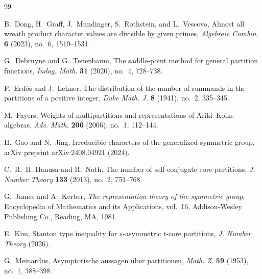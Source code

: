 \documentclass[11pt]{amsart}
\theoremstyle{plain}
\numberwithin{equation}{section}
\begin{document}
\begin{thebibliography}{99}
		
		B.~Dong, H.~Graff, J.~Mundinger, S.~Rothstein, and L.~Vescovo,
		\newblock Almost all wreath product character values are divisible by given primes,
		\newblock \emph{Algebraic Combin.} \textbf{6} (2023), no.~6, 1519--1531.
		
		G.~Debruyne and G.~Tenenbaum,
		\newblock The saddle-point method for general partition functions,
		\newblock \emph{Indag. Math.} \textbf{31} (2020), no.~4, 728--738.
		
		
		P.~Erd\H{o}s and J.~Lehner,
		\newblock The distribution of the number of summands in the partitions of a
		positive integer,
		\newblock \emph{Duke Math. J.} \textbf{8} (1941), no.~2, 335--345.
		
		M.~Fayers,
		\newblock Weights of multipartitions and representations of Ariki--Koike algebras,
		\newblock \emph{Adv. Math.} \textbf{206} (2006), no.~1, 112--144.
		
		
		
		H.~Gao and N.~Jing,
		\newblock Irreducible characters of the generalized symmetric group,
		\newblock arXiv preprint arXiv:2408.04921 (2024).
		
		C.~R.~H. Hanusa and R.~Nath,
		\newblock The number of self-conjugate core partitions,
		\newblock \emph{J. Number Theory} \textbf{133} (2013), no.~2, 751--768.
		
		G.~James and A.~Kerber,
		\newblock \emph{The representation theory of the symmetric group},
		\newblock Encyclopedia of Mathematics and its Applications, vol.~16,
		Addison-Wesley Publishing Co., Reading, MA, 1981.
		
		E.~Kim,
		\newblock Stanton type inequality for $s$-asymmetric $t$-core partitions,
		\newblock \emph{J. Number Theory} (2026).
		
		G.~Meinardus,
		\newblock Asymptotische aussagen \"{u}ber partitionen,
		\newblock \emph{Math. Z.} \textbf{59} (1953), no.~1, 388--398.
		

\end{thebibliography}
\end{document}
